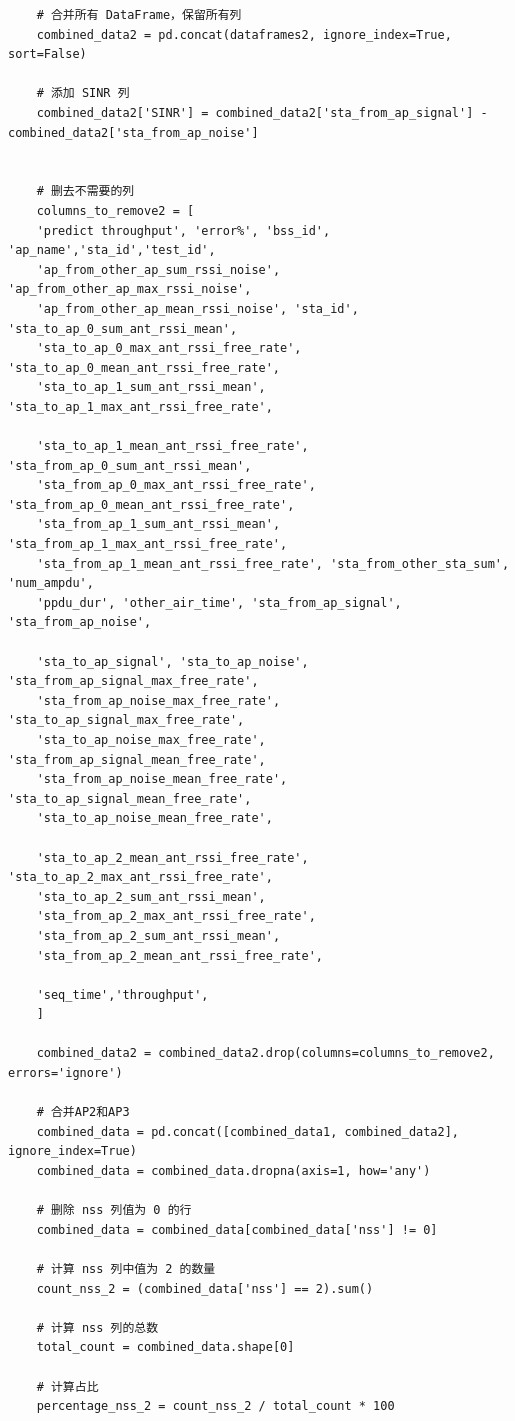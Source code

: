 \documentclass[bwprint]{gmcmthesis}
\begin{document}
\begin{lstlisting}
	# 合并所有 DataFrame，保留所有列
	combined_data2 = pd.concat(dataframes2, ignore_index=True, sort=False)
	
	# 添加 SINR 列
	combined_data2['SINR'] = combined_data2['sta_from_ap_signal'] - combined_data2['sta_from_ap_noise']
	
	
	# 删去不需要的列
	columns_to_remove2 = [
	'predict throughput', 'error%', 'bss_id', 'ap_name','sta_id','test_id',
	'ap_from_other_ap_sum_rssi_noise', 'ap_from_other_ap_max_rssi_noise',
	'ap_from_other_ap_mean_rssi_noise', 'sta_id', 'sta_to_ap_0_sum_ant_rssi_mean',
	'sta_to_ap_0_max_ant_rssi_free_rate', 'sta_to_ap_0_mean_ant_rssi_free_rate',
	'sta_to_ap_1_sum_ant_rssi_mean', 'sta_to_ap_1_max_ant_rssi_free_rate',
	
	'sta_to_ap_1_mean_ant_rssi_free_rate', 'sta_from_ap_0_sum_ant_rssi_mean',
	'sta_from_ap_0_max_ant_rssi_free_rate', 'sta_from_ap_0_mean_ant_rssi_free_rate',
	'sta_from_ap_1_sum_ant_rssi_mean', 'sta_from_ap_1_max_ant_rssi_free_rate',
	'sta_from_ap_1_mean_ant_rssi_free_rate', 'sta_from_other_sta_sum', 'num_ampdu',
	'ppdu_dur', 'other_air_time', 'sta_from_ap_signal', 'sta_from_ap_noise',
	
	'sta_to_ap_signal', 'sta_to_ap_noise', 'sta_from_ap_signal_max_free_rate',
	'sta_from_ap_noise_max_free_rate', 'sta_to_ap_signal_max_free_rate',
	'sta_to_ap_noise_max_free_rate', 'sta_from_ap_signal_mean_free_rate',
	'sta_from_ap_noise_mean_free_rate', 'sta_to_ap_signal_mean_free_rate',
	'sta_to_ap_noise_mean_free_rate',
	
	'sta_to_ap_2_mean_ant_rssi_free_rate', 'sta_to_ap_2_max_ant_rssi_free_rate',
	'sta_to_ap_2_sum_ant_rssi_mean',           
	'sta_from_ap_2_max_ant_rssi_free_rate',    
	'sta_from_ap_2_sum_ant_rssi_mean',         
	'sta_from_ap_2_mean_ant_rssi_free_rate',
	
	'seq_time','throughput',
	]
	
	combined_data2 = combined_data2.drop(columns=columns_to_remove2, errors='ignore')
	
	# 合并AP2和AP3
	combined_data = pd.concat([combined_data1, combined_data2], ignore_index=True)
	combined_data = combined_data.dropna(axis=1, how='any')
	
	# 删除 nss 列值为 0 的行
	combined_data = combined_data[combined_data['nss'] != 0]
	
	# 计算 nss 列中值为 2 的数量
	count_nss_2 = (combined_data['nss'] == 2).sum()
	
	# 计算 nss 列的总数
	total_count = combined_data.shape[0]
	
	# 计算占比
	percentage_nss_2 = count_nss_2 / total_count * 100
	

\end{lstlisting}
\end{document}
